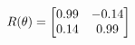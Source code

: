 \documentclass[preview]{standalone}
\begin{document}
\begin{align*}
\special{dvisvgm:raw <g id='unique000'>}R(\theta) = \begin{bmatrix}0.99 & -0.14\\0.14 & 0.99\end{bmatrix}\special{dvisvgm:raw </g>}
\end{align*}
\end{document}

